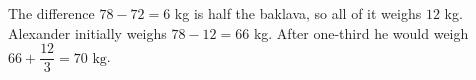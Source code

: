 The difference $78-72=6$ kg is half the baklava, so all of it weighs $12$ kg. Alexander initially weighs $78-12=66$ kg. After one-third he would weigh $66+\dfrac{12}{3}=\boxed{70\text{ kg}}$.
